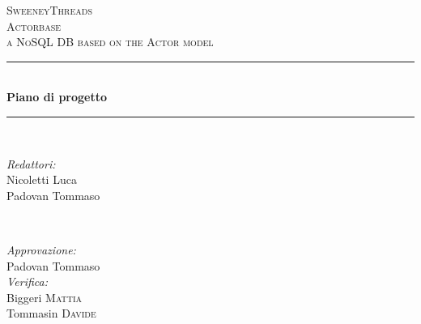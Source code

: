 \documentclass[a4paper]{report}
\begin{document}
	\begin{titlepage}
		\newcommand{\HRule}{\rule{\linewidth}{0.5mm}} 
		\center  
		
		\textsc{\LARGE SweeneyThreads}\\[1.5cm] 
		\textsc{\Large Actorbase}\\[0.5cm] 
		\textsc{\large a NoSQL DB based on the Actor model}\\[0.5cm]
		
		
		\HRule \\[0.4cm]
		{ \huge \bfseries Piano di progetto}\\[0.4cm] 
		\HRule \\[1.5cm]
		
		\begin{minipage}{0.4\textwidth}
			\begin{flushleft} \large
				\emph{Redattori:}\\
				Nicoletti Luca\\
				Padovan Tommaso \\
			\end{flushleft}
		\end{minipage}
		~
		\begin{minipage}{0.4\textwidth}
			\begin{flushright} \large
				\emph{Approvazione:} \\
				Padovan Tommaso \\
				\emph{Verifica:} \\
				Biggeri \textsc{Mattia} \\
				Tommasin \textsc{Davide} \\
			\end{flushright}
		\end{minipage}
		

\end{titlepage}
\end{document}
